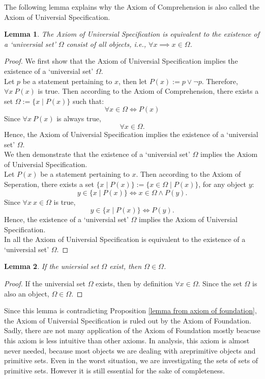 \documentclass[a4paper]{book}
\newtheorem*{proof}{\textit{Proof.}}
\theoremstyle{break}
\newtheorem{lemma}{Lemma}[section]
\begin{document}
			The following lemma explains why the Axiom of Comprehension is also called the Axiom of Universial Specification.
			\begin{lemma}
				The Axiom of Universial Specification is equivalent to the existence of a `universial set' $\Omega$ consist of all objects, \textit{i.e.,} $\forall x\implies x\in\Omega$.
			\end{lemma}
			\begin{proof}
				We first show that the Axiom of Universial Specification implies the existence of a `universial set' $\Omega$.\\
				Let $p$ be a statement pertaining to $x$, then let $P(x):=p\lor\lnot p$. Therefore, $\forall x~P(x)$ is true. Then according to the Axiom of Comprehension, there exists a set $\Omega:=\{x\mid P(x)\}$ such that:$$\forall x\in\Omega\iff P(x)$$ Since $\forall x~P(x)$ is always true, $$\forall x\in\Omega.$$ Hence, the Axiom of Universial Specification implies the existence of a `universial set' $\Omega$.\\
				We then demonstrate that the existence of a `universial set' $\Omega$ implies the Axiom of Universial Specification.\\
				Let $P(x)$ be a statement pertaining to $x$. Then according to the Axiom of Seperation, there exists a set $\{x\mid P(x)\}:=\{x\in\Omega\mid P(x)\}$, for any object $y$: $$y\in\{x\mid P(x)\}\iff x\in\Omega\land P(y).$$ Since $\forall x~x\in\Omega$ is true, $$y\in\{x\mid P(x)\}\iff P(y).$$ Hence, the existence of a `universial set' $\Omega$ implies the Axiom of Universial Specification.\\
				In all the Axiom of Universial Specification is equivalent to the existence of a `universial set' $\Omega$.
			\end{proof}
			\begin{lemma}
				If the uniersial set $\Omega$ exist, then $\Omega\in\Omega$.
			\end{lemma}
			\begin{proof}
				If the universial set $\Omega$ exists, then by definition $\forall x\in\Omega$. Since the set $\Omega$ is also an object, $\Omega\in\Omega$.
			\end{proof}
			Since this lemma is contradicting Proposition \ref{lemma from axiom of foundation}, the Axiom of Universial Specification is ruled out by the Axiom of Foundation.\\
			Sadly, there are not many application of the Axiom of Foundation mostly beacuse this axiom is less intuitive than other axioms. In analysis, this axiom is almost never needed, because most objects we are dealing with areprimitive objects and primitive sets. Even in the worst situation, we are investigating the sets of sets of primitive sets. However it is still essential for the sake of completeness.
\end{document}
